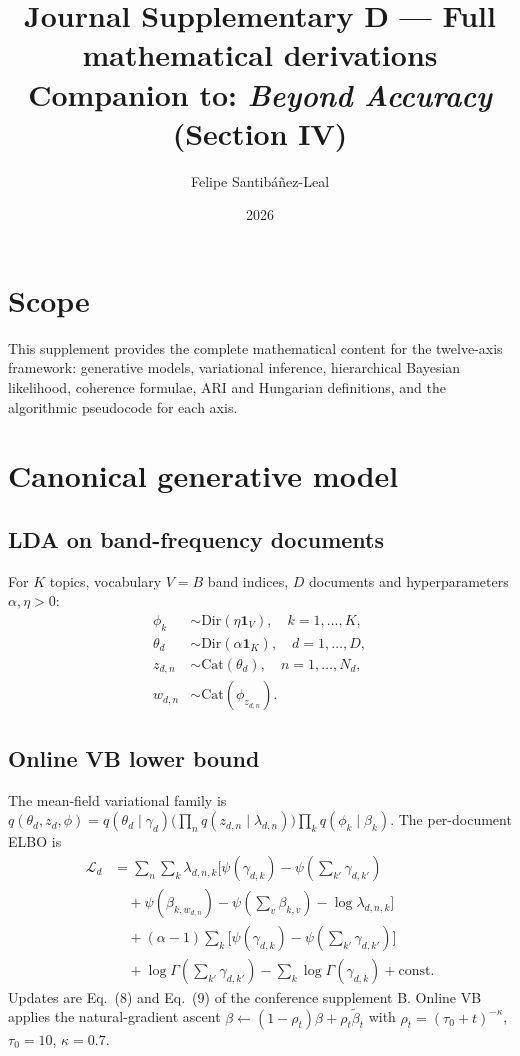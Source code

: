 \documentclass[11pt,a4paper]{article}
\title{Journal Supplementary D --- Full mathematical derivations\\
{\large Companion to: \emph{Beyond Accuracy} (Section IV)}}
\author{Felipe Santib\'a\~nez-Leal}
\date{2026}
\begin{document}
\maketitle

\section{Scope}
This supplement provides the complete mathematical content for the
twelve-axis framework: generative models, variational inference,
hierarchical Bayesian likelihood, coherence formulae, ARI and
Hungarian definitions, and the algorithmic pseudocode for each axis.

\section{Canonical generative model}

\subsection{LDA on band-frequency documents}
For $K$ topics, vocabulary $V = B$ band indices, $D$ documents and
hyperparameters $\alpha, \eta > 0$:
\begin{align}
\phi_k    & \sim \mathrm{Dir}(\eta\mathbf{1}_V), \quad k=1,\ldots,K, \\
\theta_d  & \sim \mathrm{Dir}(\alpha\mathbf{1}_K), \quad d=1,\ldots,D, \\
z_{d,n}   & \sim \mathrm{Cat}(\theta_d), \quad n=1,\ldots,N_d, \\
w_{d,n}   & \sim \mathrm{Cat}(\phi_{z_{d,n}}).
\end{align}

\subsection{Online VB lower bound}
The mean-field variational family is
$q(\theta_d, z_d, \phi) = q(\theta_d \mid \gamma_d)
\big(\prod_n q(z_{d,n} \mid \lambda_{d,n})\big) \prod_k q(\phi_k \mid
\beta_k)$. The per-document ELBO is
\begin{align}
\mathcal{L}_d
&= \sum_n \sum_k \lambda_{d,n,k}
\big[
   \psi(\gamma_{d,k}) - \psi(\textstyle\sum_{k'} \gamma_{d,k'})
   \nonumber\\
&\quad + \psi(\beta_{k, w_{d,n}}) - \psi(\textstyle\sum_v \beta_{k,v})
   - \log \lambda_{d,n,k}
\big]
\nonumber\\
&\quad + (\alpha-1) \sum_k\!\big[
   \psi(\gamma_{d,k}) - \psi(\textstyle\sum_{k'}\gamma_{d,k'})\big]
\nonumber\\
&\quad + \log \Gamma(\textstyle\sum_{k'} \gamma_{d,k'})
       - \sum_k \log \Gamma(\gamma_{d,k}) + \mathrm{const}.
\end{align}
Updates are Eq.~(8) and Eq.~(9) of the conference supplement B.
Online VB applies the natural-gradient ascent
$\beta \leftarrow (1 - \rho_t) \beta + \rho_t \tilde{\beta}_t$
with $\rho_t = (\tau_0 + t)^{-\kappa}$, $\tau_0 = 10$, $\kappa = 0.7$.
\end{document}
